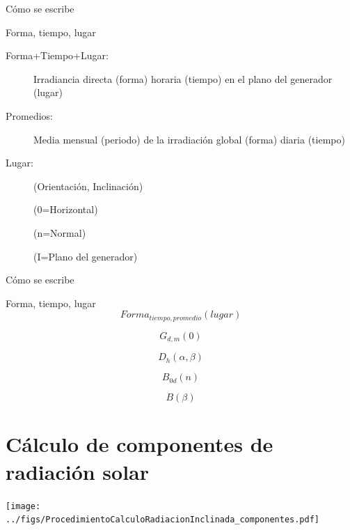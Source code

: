 \documentclass[xcolor={usenames,svgnames,dvipsnames}]{beamer}
\begin{document}
\begin{frame}[label={sec:org2a28e9f}]{Cómo se escribe}
\begin{block}{Forma, tiempo, lugar}
\begin{description}
\item[{Forma+Tiempo+Lugar:}] Irradiancia directa (forma) horaria (tiempo)
en el plano del generador (lugar)

\item[{Promedios:}] Media mensual (periodo) de la irradiación global
(forma) diaria (tiempo)

\item[{Lugar:}] (Orientación, Inclinación)

(0=Horizontal)

(n=Normal)

(I=Plano del generador)
\end{description}
\end{block}
\end{frame}

\begin{frame}[label={sec:org153bb6e}]{Cómo se escribe}
\begin{block}{Forma, tiempo, lugar}
\[Forma_{tiempo,promedio}(lugar)\]

\[G_{d,m}(0)\]

\[D_{h}(\alpha,\beta)\]

\[B_{0d}(n)\]

\[B(\beta)\]
\end{block}
\end{frame}
\section{Cálculo de componentes de radiación solar}
\label{sec:orga0ad760}

\begin{frame}[label={sec:org3e17d06}]{}
\begin{center}
\texttt{[image: ../figs/ProcedimientoCalculoRadiacionInclinada\_componentes.pdf]}
\end{center}
\end{frame}
\end{document}

